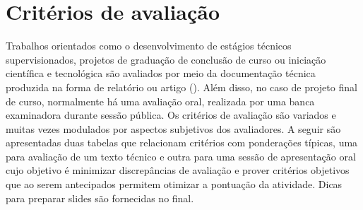 \graphicspath{{figuras/}}
\chapter{Critérios de avaliação} \label{cap5}
Trabalhos orientados como o desenvolvimento de estágios técnicos supervisionados, projetos de graduação de conclusão de curso  ou   iniciação científica e tecnológica  são avaliados por meio da documentação técnica produzida na forma de relatório ou artigo (\cite{Markel1994}).  Além disso, no caso de projeto final de curso, normalmente há uma avaliação oral, realizada por uma banca examinadora durante sessão pública. Os critérios de avaliação são variados e muitas vezes modulados por aspectos subjetivos dos avaliadores. A seguir são apresentadas duas tabelas que relacionam critérios com ponderações típicas, uma para avaliação de um texto técnico e outra para uma sessão de apresentação oral cujo objetivo é minimizar discrepâncias de avaliação e prover critérios objetivos que ao serem antecipados permitem otimizar a pontuação da atividade. Dicas para preparar slides são fornecidas no final.

